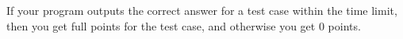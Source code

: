 If your program outputs the correct answer for a test case within the time limit, then you get full points for the test case, and otherwise you get $0$ points.
